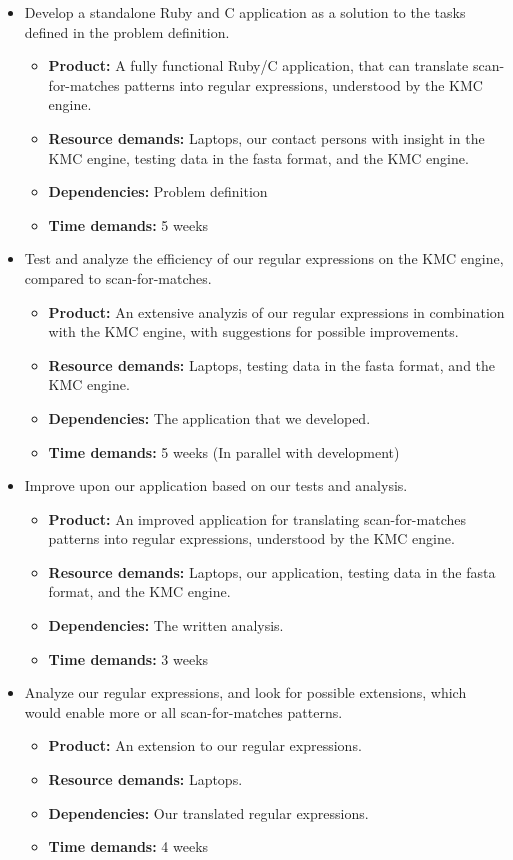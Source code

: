 \documentclass[12pt]{article}
\begin{document}
\begin{itemize}
	\item Develop a standalone Ruby and C application as a solution to the tasks defined in the problem definition.
	\begin{itemize}
		\item \textbf{Product:} A fully functional Ruby/C application, that can translate scan-for-matches patterns into regular expressions, understood by the KMC engine.
		\item \textbf{Resource demands:} Laptops, our contact persons with insight in the KMC engine, testing data in the fasta format, and the KMC engine.
		\item \textbf{Dependencies:} Problem definition
		\item \textbf{Time demands:} 5 weeks
	\end{itemize}
	
	\item Test and analyze the efficiency of our regular expressions on the KMC engine, compared to scan-for-matches.
	\begin{itemize}
		\item \textbf{Product:} An extensive analyzis of our regular expressions in combination with the KMC engine, with suggestions for possible improvements.
		\item \textbf{Resource demands:} Laptops, testing data in the fasta format, and the KMC engine.
		\item \textbf{Dependencies:} The application that we developed.
		\item \textbf{Time demands:} 5 weeks (In parallel with development)
	\end{itemize}
	
	\item Improve upon our application based on our tests and analysis.
	\begin{itemize}
		\item \textbf{Product:} An improved application for translating scan-for-matches patterns into regular expressions, understood by the KMC engine.
		\item \textbf{Resource demands:} Laptops, our application, testing data in the fasta format, and the KMC engine.
		\item \textbf{Dependencies:} The written analysis.
		\item \textbf{Time demands:} 3 weeks
	\end{itemize}
	
	\item Analyze our regular expressions, and look for possible extensions, which would enable more or all scan-for-matches patterns.
	\begin{itemize}
		\item \textbf{Product:} An extension to our regular expressions.
		\item \textbf{Resource demands:} Laptops.
		\item \textbf{Dependencies:} Our translated regular expressions.
		\item \textbf{Time demands:} 4 weeks
	\end{itemize}
\end{itemize}
\end{document}

